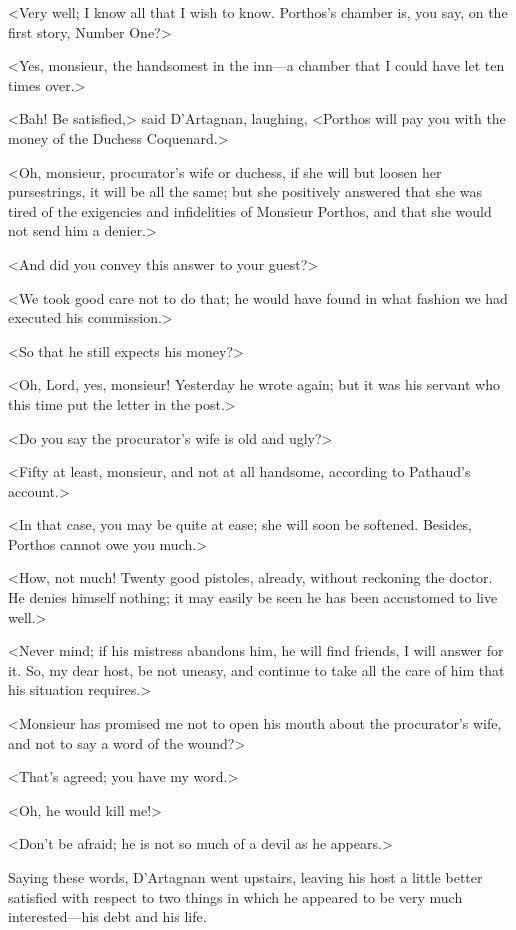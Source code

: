 <Very well; I know all that I wish to know. Porthos's chamber is, you say, on the first story, Number One?> 

<Yes, monsieur, the handsomest in the inn—a chamber that I could have let ten times over.> 

<Bah! Be satisfied,> said D'Artagnan, laughing, <Porthos will pay you with the money of the Duchess Coquenard.> 

<Oh, monsieur, procurator's wife or duchess, if she will but loosen her pursestrings, it will be all the same; but she positively answered that she was tired of the exigencies and infidelities of Monsieur Porthos, and that she would not send him a denier.> 

<And did you convey this answer to your guest?> 

<We took good care not to do that; he would have found in what fashion we had executed his commission.> 

<So that he still expects his money?> 

<Oh, Lord, yes, monsieur! Yesterday he wrote again; but it was his servant who this time put the letter in the post.> 

<Do you say the procurator's wife is old and ugly?> 

<Fifty at least, monsieur, and not at all handsome, according to Pathaud's account.> 

<In that case, you may be quite at ease; she will soon be softened. Besides, Porthos cannot owe you much.> 

<How, not much! Twenty good pistoles, already, without reckoning the doctor. He denies himself nothing; it may easily be seen he has been accustomed to live well.> 

<Never mind; if his mistress abandons him, he will find friends, I will answer for it. So, my dear host, be not uneasy, and continue to take all the care of him that his situation requires.> 

<Monsieur has promised me not to open his mouth about the procurator's wife, and not to say a word of the wound?> 

<That's agreed; you have my word.> 

<Oh, he would kill me!> 

<Don't be afraid; he is not so much of a devil as he appears.> 

Saying these words, D'Artagnan went upstairs, leaving his host a little better satisfied with respect to two things in which he appeared to be very much interested—his debt and his life. 

